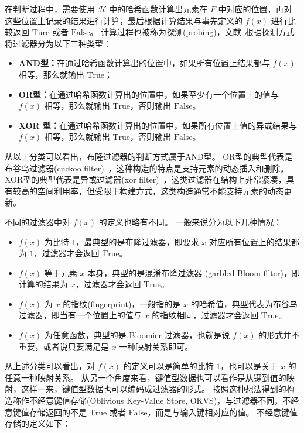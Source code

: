 在判断过程中，需要使用 $\mathcal{H}$ 中的哈希函数计算出元素在 $F$ 中对应的位置，再对这些位置上记录的结果进行计算，最后根据计算结果与事先定义的 $f(x)$ 进行比较返回 $\mbox{Ture}$ 或者 $\mbox{False}$。
计算过程也被称为探测(probing)，文献~\cite{dillinger2021ribbon}根据探测方式将过滤器分为以下三种类型：
\begin{itemize}
    \item \textbf{AND型：}在通过哈希函数计算出的位置中，如果所有位置上结果都与 $f(x)$ 相等，那么就输出 $\mbox{True}$；
    \item \textbf{OR型：}在通过哈希函数计算出的位置中，如果至少有一个位置上的值与 $f(x)$ 相等，那么就输出 $\mbox{True}$，否则输出 $\mbox{False}$。
    \item \textbf{XOR 型：}在通过哈希函数计算出的位置中，如果所有位置上值的异或结果与 $f(x)$ 相等，那么就输出 $\mbox{True}$，否则输出 $\mbox{False}$。
\end{itemize}
从以上分类可以看出，布隆过滤器的判断方式属于AND型。
OR型的典型代表是布谷鸟过滤器(cuckoo filter)~\cite{fan2014cuckoo}，这种构造的特点是支持元素的动态插入和删除。
XOR型的典型代表是异或过滤器(xor filter)~\cite{fan2014cuckoo}，这类过滤器在结构上非常紧凑，具有较高的空间利用率，但受限于构建方式，这类构造通常不能支持元素的动态更新。

不同的过滤器中对 $f(x)$ 的定义也略有不同。
一般来说分为以下几种情况：
\begin{itemize}
    \item $f(x)$ 为比特 $1$，最典型的是布隆过滤器，即要求 $x$ 对应所有位置上的结果都为 $1$，过滤器才会返回 $\mbox{True}$。
    \item $f(x)$ 等于元素 $x$ 本身，典型的是混淆布隆过滤器 (garbled Bloom filter)，即计算的结果为 $x$，过滤器才会返回 $\mbox{True}$。
    \item $f(x)$ 为 $x$ 的指纹(fingerprint)，一般指的是 $x$ 的哈希值，典型代表为布谷鸟过滤器，即当有一个位置上的值与 $x$ 的指纹相同，过滤器才会返回 $\mbox{True}$。
    \item $f(x)$ 为任意函数，典型的是 Bloomier 过滤器，也就是说 $f(x)$ 的形式并不重要，或者说只要满足是 $x$ 一种映射关系即可。
\end{itemize}

从上述分类可以看出，对 $f(x)$ 的定义可以是简单的比特 $1$，也可以是关于 $x$ 的任意一种映射关系。
从另一个角度来看，键值型数据也可以看作是从键到值的映射，这样一来，键值型数据也可以编码成过滤器的形式。
按照这种想法得到的构造称作不经意键值存储(Oblivious Key-Value Store, OKVS)，与过滤器不同，不经意键值存储返回的不是 $\mbox{True}$ 或者 $\mbox{False}$，而是与输入键相对应的值。
不经意键值存储的定义如下：

